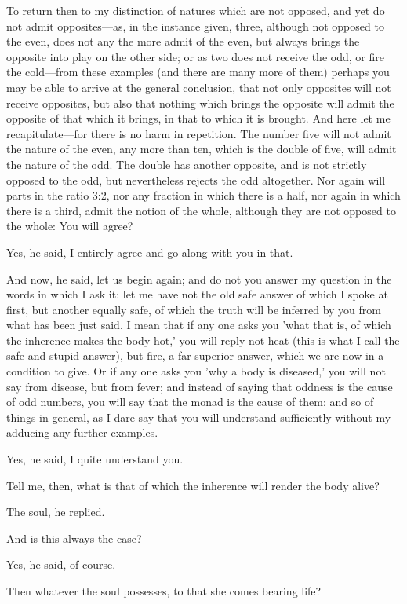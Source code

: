 To return then to my distinction of natures which are not opposed, and yet
do not admit opposites—as, in the instance given, three, although
not opposed to the even, does not any the more admit of the even, but
always brings the opposite into play on the other side; or as two does not
receive the odd, or fire the cold—from these examples (and there are
many more of them) perhaps you may be able to arrive at the general
conclusion, that not only opposites will not receive opposites, but also
that nothing which brings the opposite will admit the opposite of that
which it brings, in that to which it is brought. And here let me
recapitulate—for there is no harm in repetition. The number five
will not admit the nature of the even, any more than ten, which is the
double of five, will admit the nature of the odd. The double has another
opposite, and is not strictly opposed to the odd, but nevertheless rejects
the odd altogether. Nor again will parts in the ratio 3:2, nor any
fraction in which there is a half, nor again in which there is a third,
admit the notion of the whole, although they are not opposed to the whole:
You will agree?

Yes, he said, I entirely agree and go along with you in that.

And now, he said, let us begin again; and do not you answer my question in
the words in which I ask it: let me have not the old safe answer of which
I spoke at first, but another equally safe, of which the truth will be
inferred by you from what has been just said. I mean that if any one asks
you 'what that is, of which the inherence makes the body hot,' you will
reply not heat (this is what I call the safe and stupid answer), but fire,
a far superior answer, which we are now in a condition to give. Or if any
one asks you 'why a body is diseased,' you will not say from disease, but
from fever; and instead of saying that oddness is the cause of odd
numbers, you will say that the monad is the cause of them: and so of
things in general, as I dare say that you will understand sufficiently
without my adducing any further examples.

Yes, he said, I quite understand you.

Tell me, then, what is that of which the inherence will render the body
alive?

The soul, he replied.

And is this always the case?

Yes, he said, of course.

Then whatever the soul possesses, to that she comes bearing life?

